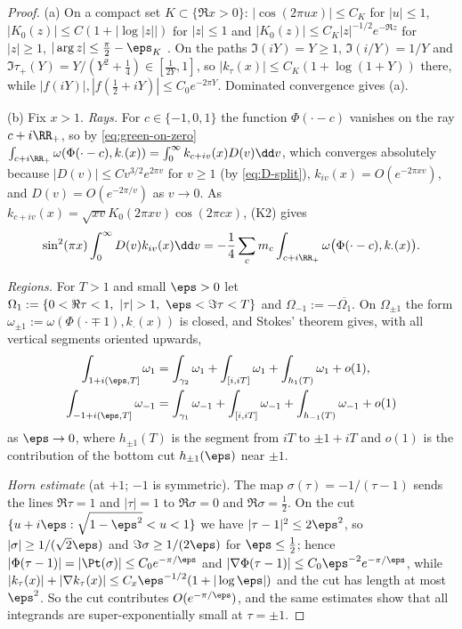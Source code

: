 \begin{proof}
(a) On a compact set $K\subset\{\Re x>0\}$: $|\cos(2\pi ux)|\le C_K$ for $|u|\le1$, $|K_0(z)|\le C(1+|\log|z||)$ for $|z|\le1$ and
$|K_0(z)|\le C_K|z|^{-1/2}e^{-\Re z}$ for $|z|\ge1$, $|\arg z|\le\frac\pi2-\eps_K$ \cite[10.40.2, 10.40.10]{DLMF}. On the paths
$\Im(iY)=Y\ge1$, $\Im(i/Y)=1/Y$ and $\Im\tau_+(Y)=Y/(Y^2+\frac14)\in[\frac1{2Y},1]$, so $|k_\tau(x)|\le C_K(1+\log(1+Y))$ there, while
$|f(iY)|,|f(\frac12+iY)|\le C_0e^{-2\pi Y}$. Dominated convergence gives (a).

(b) Fix $x>1$. \emph{Rays.} For $c\in\{-1,0,1\}$ the function $\Phi(\cdot-c)$ vanishes on the ray $c+i\RR_+$, so by \eqref{eq:green-on-zero}
$\int_{c+i\RR_+}\omega(\Phi(\cdot-c),k_\cdot(x))=\int_0^\infty k_{c+iv}(x)D(v)\dd v$, which converges absolutely because $|D(v)|\le Cv^{3/2}e^{2\pi v}$ for
$v\ge1$ (by \eqref{eq:D-split}), $k_{iv}(x)=O(e^{-2\pi xv})$, and $D(v)=O(e^{-2\pi/v})$ as $v\to0$. As $k_{c+iv}(x)=\sqrt{xv}K_0(2\pi xv)\cos(2\pi cx)$,
(K2) gives
\begin{equation}\label{eq:three-ray}
\sin^2(\pi x)\int_0^\infty D(v)k_{iv}(x)\dd v=-\frac14\sum_cm_c\int_{c+i\RR_+}\omega\big(\Phi(\cdot-c),k_\cdot(x)\big).
\end{equation}

\emph{Regions.} For $T>1$ and small $\eps>0$ let $\Omega_1:=\{0<\Re\tau<1,\ |\tau|>1,\ \eps<\Im\tau<T\}$ and $\Omega_{-1}:=-\overline{\Omega_1}$. On
$\Omega_{\pm1}$ the form $\omega_{\pm1}:=\omega(\Phi(\cdot\mp1),k_\cdot(x))$ is closed, and Stokes' theorem gives, with all vertical segments
oriented upwards,
\begin{align*}
\int_{1+i(\eps,T]}\omega_1&=\int_{\gamma_2}\omega_1+\int_{[i,iT]}\omega_1+\int_{h_1(T)}\omega_1+o(1),\\
\int_{-1+i(\eps,T]}\omega_{-1}&=\int_{\gamma_1}\omega_{-1}+\int_{[i,iT]}\omega_{-1}+\int_{h_{-1}(T)}\omega_{-1}+o(1)
\end{align*}
as $\eps\to0$, where $h_{\pm1}(T)$ is the segment from $iT$ to $\pm1+iT$ and $o(1)$ is the contribution of the bottom cut $h_{\pm1}(\eps)$ near $\pm1$.

\emph{Horn estimate} (at $+1$; $-1$ is symmetric). The map $\sigma(\tau)=-1/(\tau-1)$ sends the lines $\Re\tau=1$ and $|\tau|=1$ to $\Re\sigma=0$
and $\Re\sigma=\frac12$. On the cut $\{u+i\eps:\sqrt{1-\eps^2}<u<1\}$ we have $|\tau-1|^2\le2\eps^2$, so $|\sigma|\ge1/(\sqrt2\eps)$ and
$\Im\sigma\ge1/(2\eps)$ for $\eps\le\frac12$; hence $|\Phi(\tau-1)|=|\Pt(\sigma)|\le C_0e^{-\pi/\eps}$ and $|\nabla\Phi(\tau-1)|\le C_0\eps^{-2}e^{-\pi/\eps}$,
while $|k_\tau(x)|+|\nabla k_\tau(x)|\le C_x\eps^{-1/2}(1+|\log\eps|)$ and the cut has length at most $\eps^2$. So the cut contributes
$O(e^{-\pi/\eps})$, and the same estimates show that all integrands are super-exponentially small at $\tau=\pm1$.


\end{proof}
